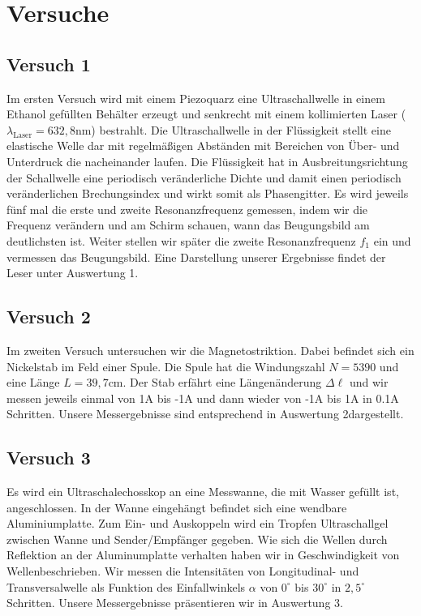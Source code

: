 \documentclass[a4paper, 12pt]{scrartcl}
\begin{document}
\section{Versuche}
\subsection{Versuch 1}
Im ersten Versuch wird mit einem Piezoquarz eine Ultraschallwelle in einem Ethanol gefüllten Behälter erzeugt und senkrecht mit einem kollimierten Laser ($\lambda_{\textrm{Laser}} = 632,8$nm) bestrahlt. Die Ultraschallwelle in der Flüssigkeit stellt eine elastische Welle dar mit regelmäßigen Abständen mit Bereichen von Über- und Unterdruck die nacheinander laufen. Die Flüssigkeit hat in Ausbreitungsrichtung der Schallwelle eine periodisch veränderliche Dichte und damit einen periodisch veränderlichen Brechungsindex und wirkt somit als Phasengitter.
Es wird jeweils fünf mal die erste und zweite Resonanzfrequenz gemessen, indem wir die Frequenz verändern und am Schirm schauen, wann das Beugungsbild am deutlichsten ist. Weiter stellen wir später die zweite Resonanzfrequenz $f_1$ ein und vermessen das Beugungsbild. Eine Darstellung unserer Ergebnisse findet der Leser unter \glqq Auswertung 1\grqq .
 
\subsection{Versuch 2} 
Im zweiten Versuch untersuchen wir die Magnetostriktion. Dabei befindet sich ein Nickelstab im Feld einer Spule. Die Spule hat die Windungszahl $N=5390$ und eine Länge $L=39,7$cm. Der Stab erfährt eine Längenänderung $\Delta \ell$ und wir messen jeweils einmal von 1A bis -1A und dann wieder von -1A bis 1A in 0.1A Schritten. Unsere Messergebnisse sind entsprechend in \glqq Auswertung 2\grqq \space dargestellt. 
\subsection{Versuch 3}
Es wird ein Ultraschalechosskop an eine Messwanne, die mit Wasser gefüllt ist, angeschlossen. In der Wanne eingehängt befindet sich eine wendbare Aluminiumplatte. Zum Ein- und Auskoppeln wird ein Tropfen Ultraschallgel zwischen Wanne und Sender/Empfänger gegeben. Wie sich die Wellen durch Reflektion an der Aluminumplatte verhalten haben wir in \glqq Geschwindigkeit von Wellen\grqq \space beschrieben. Wir messen die Intensitäten von Longitudinal- und Transversalwelle als Funktion des Einfallwinkels $\alpha$ von $0^\circ$ bis $30^\circ$ in $2,5^\circ$ Schritten. Unsere Messergebnisse präsentieren wir in \glqq Auswertung 3\grqq .
\newpage
\end{document}
